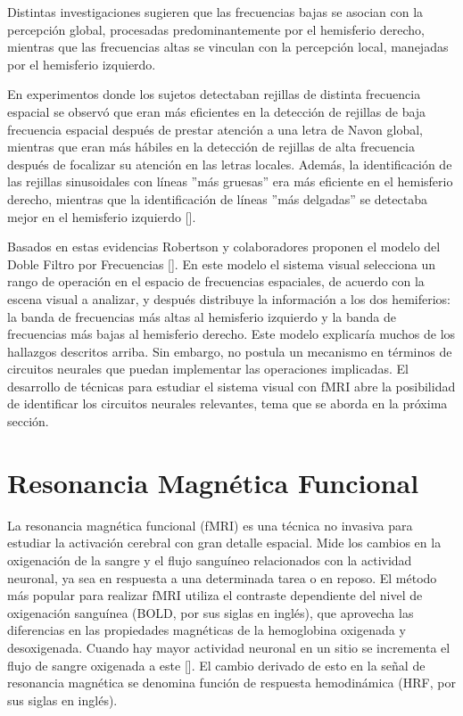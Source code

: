 Distintas investigaciones sugieren que las frecuencias bajas se asocian con la percepción global, procesadas predominantemente por el hemisferio derecho, mientras que las frecuencias altas se vinculan con la percepción local, manejadas por el hemisferio izquierdo.

En experimentos donde los sujetos detectaban  rejillas de distinta frecuencia espacial se observó que eran más eficientes en la detección de rejillas de baja frecuencia espacial después de prestar atención a una letra de Navon global, mientras que eran más hábiles en la detección de rejillas de alta frecuencia después de focalizar su atención en las letras locales. Además, la identificación de las rejillas sinusoidales con líneas  ”más gruesas” era más eficiente en el hemisferio derecho, mientras que la identificación de líneas ”más delgadas” se detectaba mejor en  el hemisferio izquierdo [\cite{flevaris_local_2010}]. 

Basados en estas evidencias Robertson y colaboradores proponen el modelo del Doble Filtro por Frecuencias [\cite{robertson_hemispheric_2000}]. En este modelo el sistema visual selecciona un rango de operación en el espacio de frecuencias espaciales, de acuerdo con la escena visual a analizar, y después distribuye la información a los dos hemiferios: la banda de frecuencias más altas al hemisferio izquierdo y la banda de frecuencias más bajas al hemisferio derecho. Este modelo explicaría muchos de los hallazgos descritos arriba. Sin embargo, no postula un mecanismo en términos de circuitos neurales que puedan implementar las operaciones implicadas. El desarrollo de técnicas para estudiar el sistema visual con fMRI abre la posibilidad de identificar los circuitos neurales relevantes, tema que se aborda en la próxima sección.

\section{Resonancia Magn\'etica Funcional}

La resonancia magnética funcional (fMRI) es una técnica no invasiva para estudiar la activación cerebral con gran detalle espacial. Mide los cambios en la oxigenación de la sangre y el flujo sanguíneo relacionados con la actividad neuronal, ya sea en respuesta a una determinada tarea o en reposo. El método más popular para realizar fMRI utiliza el contraste dependiente del nivel de oxigenación sanguínea (BOLD, por sus siglas en ingl\'es), que aprovecha las diferencias en las propiedades magnéticas de la hemoglobina oxigenada y desoxigenada. Cuando hay mayor actividad neuronal en un sitio se incrementa el flujo de sangre oxigenada a este [\cite{lindquist_principles_nodate}]. El cambio derivado de esto en la señal de resonancia magnética se denomina función de respuesta hemodinámica (HRF, por sus siglas en ingl\'es).

